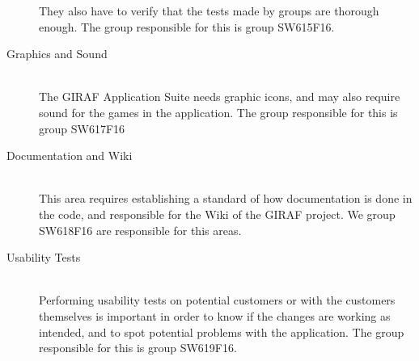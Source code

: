 \begin{description}
	They also have to verify that the tests made by groups are thorough enough.
	The group responsible for this is group SW615F16.
	\item[Graphics and Sound] \hfill \\
	The GIRAF Application Suite needs graphic icons, and may also require sound for the games in the application. 
	The group responsible for this is group SW617F16
	\item[Documentation and Wiki] \hfill \\
	This area requires establishing a standard of how documentation is done in the code, and responsible for the Wiki of the GIRAF project. We group SW618F16 are responsible for this areas.
	\item[Usability Tests] \hfill \\
	Performing usability tests on potential customers or with the customers themselves is important in order to know if the changes are working as intended, and to spot potential problems with the application. The group responsible for this is group SW619F16.	
\end{description}

